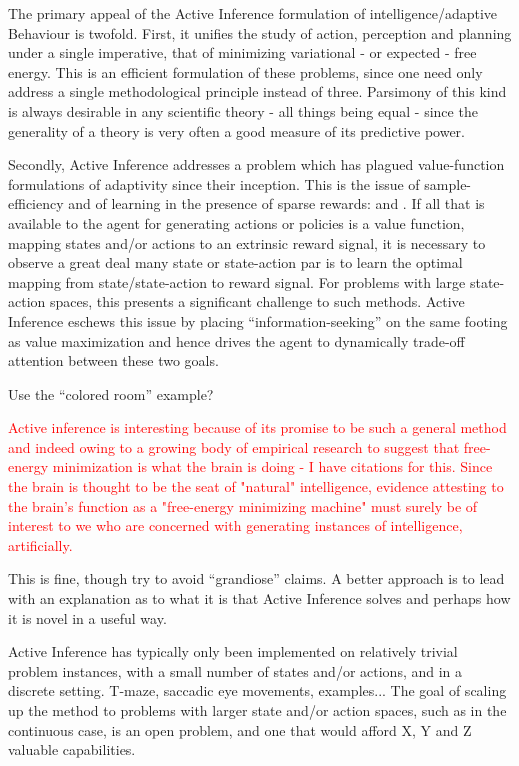 \documentclass[onecolumn]{IEEEtran}
\begin{document}
The primary appeal of the Active Inference formulation of intelligence/adaptive Behaviour is twofold. First, it unifies the study of action, perception and planning under a single imperative, that of minimizing variational - or expected - free energy. This is an efficient formulation of these problems, since one need only address a single methodological principle instead of three. Parsimony of this kind is always desirable in any scientific theory - all things being equal - since the generality of a theory is very often a good measure of its predictive power.  

Secondly, Active Inference addresses a problem which has plagued value-function formulations of adaptivity since their inception. This is the issue of sample-efficiency and of learning in the presence of sparse rewards: \textcite{RLflawed} and \textcite{RL-Real-World-Challenges}. If all that is available to the agent for generating actions or policies is a value function, mapping states and/or actions to an extrinsic reward signal, it is necessary to observe a great deal many state or state-action par is to learn the optimal mapping from state/state-action to reward signal. For problems with large state-action spaces, this presents a significant challenge to such methods. Active Inference eschews this issue by placing ``information-seeking'' on the same footing as value maximization and hence drives the agent to dynamically trade-off attention between these two goals. 

Use the ``colored room'' example?


\textcolor{red}{Active inference is interesting because of its promise to be such a general method and indeed owing to a growing body of empirical research to suggest that free-energy minimization is what the brain is doing - I have citations for this. Since the brain is thought to be the seat of "natural" intelligence, evidence attesting to the brain's function as a "free-energy minimizing machine" must surely be of interest to we who are concerned with generating instances of intelligence, artificially.}

This is fine, though try to avoid ``grandiose'' claims. A better approach is to lead with an explanation as to what it is that Active Inference solves and perhaps how it is novel in a useful way. 

Active Inference has typically only been implemented on relatively trivial problem instances, with a small number of states and/or actions, and in a discrete setting. T-maze, saccadic eye movements, examples... The goal of scaling up the method to problems with larger state and/or action spaces, such as in the continuous case, is an open problem, and one that would afford X, Y and Z valuable capabilities.  
\end{document}
